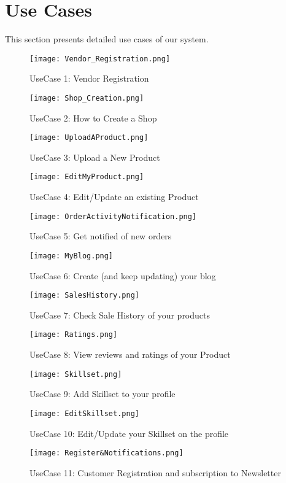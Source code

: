 \section{Use Cases}
This section presents detailed use cases of our system.\\
\begin{figure}
  \caption{UseCase 1: Vendor Registration}
  \texttt{[image: Vendor\_Registration.png]}
  \centering
\end{figure}
\begin{figure}
  \caption{UseCase 2: How to Create a Shop}
  \texttt{[image: Shop\_Creation.png]}
  \centering
\end{figure}
\begin{figure}
  \caption{UseCase 3: Upload a New Product}
  \texttt{[image: UploadAProduct.png]}
  \centering
\end{figure}
\begin{figure}
  \caption{UseCase 4: Edit/Update an existing Product}
  \texttt{[image: EditMyProduct.png]}
  \centering
\end{figure}
\begin{figure}
  \caption{UseCase 5: Get notified of new orders}
  \texttt{[image: OrderActivityNotification.png]}
  \centering
\end{figure}
\begin{figure}
  \caption{UseCase 6: Create (and keep updating) your blog}
  \texttt{[image: MyBlog.png]}
  \centering
\end{figure}
\begin{figure}
  \caption{UseCase 7: Check Sale History of your products}
  \texttt{[image: SalesHistory.png]}
  \centering
\end{figure}
\begin{figure}
  \caption{UseCase 8: View reviews and ratings of your Product}
  \texttt{[image: Ratings.png]}
  \centering
\end{figure}
\begin{figure}
  \caption{UseCase 9: Add Skillset to your profile}
  \texttt{[image: Skillset.png]}
  \centering
\end{figure}
\begin{figure}
  \caption{UseCase 10: Edit/Update your Skillset on the profile}
  \texttt{[image: EditSkillset.png]}
  \centering
\end{figure}
\begin{figure}
  \caption{UseCase 11: Customer Registration and subscription to Newsletter}
  \texttt{[image: Register\&Notifications.png]}
  \centering
\end{figure}

